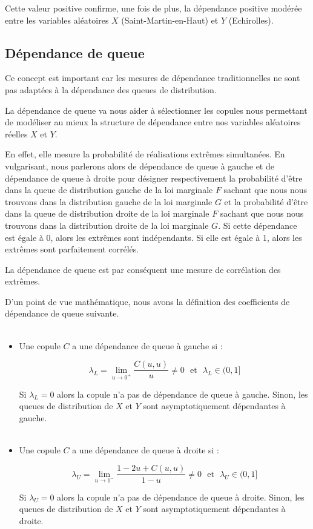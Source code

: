 \begin{center}
\end{center}

Cette valeur positive confirme, une fois de plus, la dépendance positive modérée entre les variables aléatoires $X$ (Saint-Martin-en-Haut) et $Y$ (Echirolles).



\subsection{Dépendance de queue}

Ce concept est important car les mesures de dépendance traditionnelles ne sont pas adaptées à la
dépendance des queues de distribution. 

La dépendance de queue va nous aider à sélectionner les copules nous permettant de modéliser au mieux la structure de dépendance entre nos variables 
aléatoires réelles $X$ et $Y$. 

En effet, elle mesure la probabilité de réalisations extrêmes simultanées. En vulgarisant, nous parlerons alors
de dépendance de queue à gauche et de dépendance de queue à droite pour désigner respectivement la
probabilité d'être dans la queue de distribution gauche de la loi marginale $F$ sachant que nous nous trouvons dans la distribution gauche de la loi marginale $G$ et la probabilité d'être dans la queue de distribution
droite de la loi marginale $F$ sachant que nous nous trouvons dans la distribution droite de la loi marginale
$G$. Si cette dépendance est égale à 0, alors les extrêmes sont indépendants. Si elle est égale à 1, alors les
extrêmes sont parfaitement corrélés. 

La dépendance de queue est par conséquent une mesure de corrélation des extrêmes.

D'un point de vue mathématique, nous avons la définition des coefficients de dépendance de queue suivante.
~\\~
\begin{itemize}
\item Une copule $C$ a une dépendance de queue à gauche si :

$$
\lambda_L = \underset{u \rightarrow 0^+}{\operatorname{lim}} \frac{C(u,u)}{u} \neq 0 \text{~~et~~} \lambda_L \in (0,1]
$$

Si $\lambda_L =0$ alors la copule n'a pas de dépendance de queue à gauche. Sinon, les queues de distribution de $X$ et $Y$ sont asymptotiquement
dépendantes à gauche.
~\\~
\item Une copule $C$ a une dépendance de queue à droite si :

$$
\lambda_U= \underset{u \rightarrow 1^-}{\operatorname{lim}} \frac{1-2u + C(u,u)}{1-u} \neq 0 \text{~~et~~} \lambda_U \in (0,1]
$$

Si $\lambda_U =0$ alors la copule n'a pas de dépendance de queue à droite. Sinon, les queues de distribution de $X$ et $Y$ sont asymptotiquement
dépendantes à droite.

\end{itemize}

